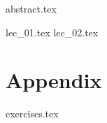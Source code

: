 \documentclass[a4paper, english, fancyfoot, git, dvipsnames]{mkessler-script}
\author{Maximilian Keßler}
\begin{document}
    \maketitle

    {abstract.tex}

    \cleardoublepage
    \tableofcontents

    \cleardoublepage
    \summaryoflectures

    \cleardoublepage
    {lec_01.tex}
    {lec_02.tex}

    \cleardoublepage
    \appendix
    \part{Appendix}

    {exercises.tex}
    

    \cleardoublepage
    \printvocabindex


    \cleardoublepage
    \printliterature
\end{document}
